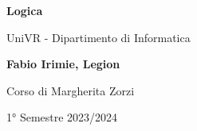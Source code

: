 \begin{titlepage}
	\begin{center}
		\vspace*{1cm}

		\Huge
		\textbf{Logica}

		\vspace{0.5cm}
		\LARGE
		UniVR - Dipartimento di Informatica

		\vspace{1.5cm}

		\textbf{Fabio Irimie, Legion}

		\vfill


		\vspace{0.8cm}

    Corso di Margherita Zorzi

		1° Semestre 2023/2024

	\end{center}
\end{titlepage}
